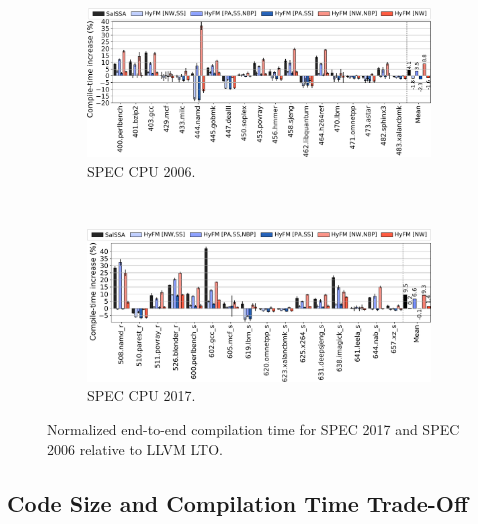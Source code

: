  \begin{figure}[h]
   \centering
 \begin{subfigure}{\textwidth}
 \center
   \includegraphics[width=\textwidth]{src/lctes21/figs/compiletime-spec06.pdf}
 \caption{SPEC CPU 2006.}
 \label{fig:compiletime-spec06}
 \end{subfigure}
 \\
 \begin{subfigure}{\textwidth}
 \center
   \includegraphics[width=\textwidth]{src/lctes21/figs/compiletime-spec17.pdf}
 \caption{SPEC CPU 2017.}
 \label{fig:compiletime-spec17}
 \end{subfigure}
 \caption{Normalized end-to-end compilation time for SPEC 2017 and SPEC 2006 relative to LLVM LTO.}
  \label{fig:compiletime-both}
 \end{figure}



\subsection{Code Size and Compilation Time Trade-Off} \label{sec:eval:trade-off}

